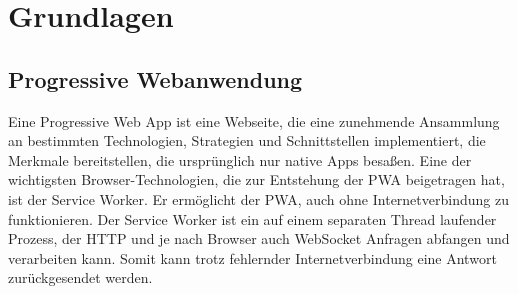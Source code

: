 \chapter{Grundlagen}
\label{chap:grundlagen}

\section{Progressive Webanwendung}
\label{sec:progressivewebanwendung}
Eine Progressive Web App ist eine Webseite, die eine zunehmende Ansammlung an bestimmten Technologien,
Strategien und Schnittstellen implementiert, die Merkmale bereitstellen, die ursprünglich nur
native Apps besaßen.\cite{WikiPWA} Eine der wichtigsten Browser-Technologien, die zur Entstehung der PWA beigetragen hat,
ist der Service Worker. Er ermöglicht der PWA, auch ohne Internetverbindung zu funktionieren. Der 
Service Worker ist ein auf einem separaten Thread laufender Prozess, der HTTP und je nach Browser
auch WebSocket Anfragen abfangen und verarbeiten kann. Somit kann trotz fehlernder Internetverbindung
eine Antwort zurückgesendet werden.\cite{W3ServiceWorker}


